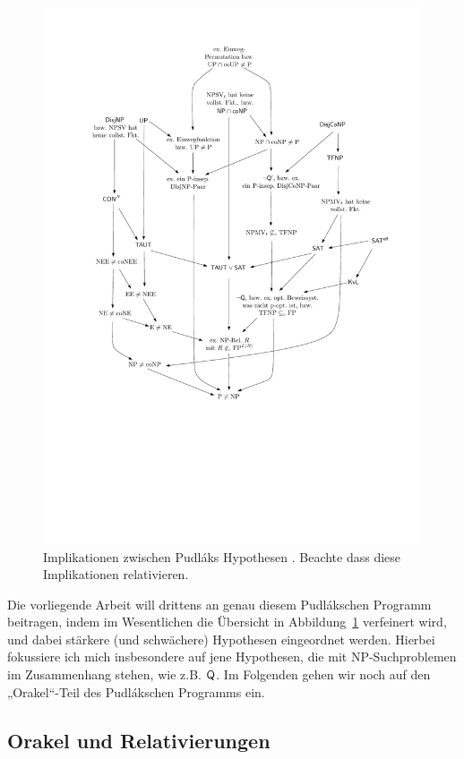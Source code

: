 \begin{figure}[tb]
    \centering\includegraphics[page=8]{figures.pdf}
    \caption{Implikationen zwischen Pudláks Hypothesen \parencite*{pudlak_incompleteness_2017}. Beachte dass diese Implikationen relativieren.}\label{fig:pudlak-small}
\end{figure}

Die vorliegende Arbeit will drittens an genau diesem Pudlákschen Programm beitragen, indem im Wesentlichen die Übersicht in Abbildung~\ref{fig:pudlak-small} verfeinert wird, und dabei stärkere (und schwächere) Hypothesen eingeordnet werden. Hierbei fokussiere ich mich insbesondere auf jene Hypothesen, die mit NP-Suchproblemen im Zusammenhang stehen, wie z.B. $\mathsf{Q}$.
Im Folgenden gehen wir noch auf den „Orakel“-Teil des Pudlákschen Programms ein.


\subsection*{Orakel und Relativierungen}

